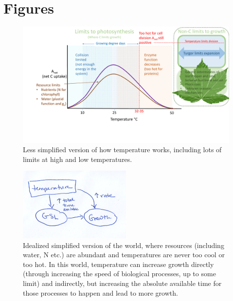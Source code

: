 \documentclass[11pt]{article}
\begin{document}
\newpage
\section{Figures}
\begin{figure}[h!]
\includegraphics[width=1\textwidth]{..//figures/grephonfig.pdf}
\caption{Less simplified version of how temperature works, including lots of limits at high and low temperatures.}
\label{fig:temperaturecomplex}
\end{figure}


\begin{figure}[h!]
\includegraphics[width=0.5\textwidth]{..//figures/gsltogrowth/gsltogrowth_emw1a.png}
\caption{Idealized simplified version of the world, where resources (including water, N etc.) are abundant and temperatures are never too cool or too hot. In this world, temperature can increase growth directly (through increasing the speed of biological processes, up to some limit) and indirectly, but increasing the absolute available time for those processes to happen and lead to more growth.}
\label{fig:concepbiotime}
\end{figure}
\end{document}
